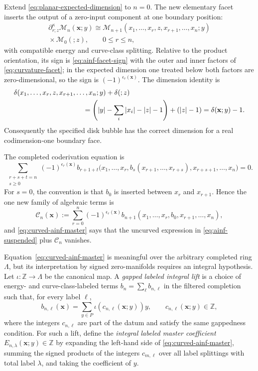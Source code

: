 \documentclass[11pt,letterpaper,twoside]{article}
\theoremstyle{plain}
\theoremstyle{definition}
\theoremstyle{remark}
\begin{document}
Extend \eqref{eq:planar-expected-dimension} to \(n=0\).  The new elementary facet inserts the output of a zero-input component at one boundary position:
\begin{multline}\label{eq:curvature-facet}
 \partial^{\kappa}_{r;z}\mathcal M_n(\mathbf x;y)
 \cong
 \mathcal M_{n+1}
 (x_1,\ldots,x_r,z,x_{r+1},\ldots,x_n;y)
 \\
 {}\times\mathcal M_0(;z),
 \qquad 0\leq r\leq n,
\end{multline}
with compatible energy and curve-class splitting.  Relative to the product orientation, its sign is \eqref{eq:ainf-facet-sign} with the outer and inner factors of \eqref{eq:curvature-facet}; in the expected dimension one treated below both factors are zero-dimensional, so the sign is \((-1)^{\epsilon_r(\mathbf x)}\).  The dimension identity is
\begin{align}\label{eq:curvature-dimension}
 &\delta(x_1,\ldots,x_r,z,x_{r+1},\ldots,x_n;y)
 +\delta(;z) \notag\\
 &\hspace{35mm}=
 \left(|y|-\sum_i|x_i|-|z|-1\right)+(|z|-1)
 =\delta(\mathbf x;y)-1.
\end{align}
Consequently the specified disk bubble has the correct dimension for a real codimension-one boundary face.

The completed coderivation equation is
\begin{equation}\label{eq:curved-ainf-master}
 \sum_{\substack{r+s+t=n\\s\geq0}}
 (-1)^{\epsilon_r(\mathbf x)}
 b_{r+1+t}\bigl(
 x_1,\ldots,x_r,
 b_s(x_{r+1},\ldots,x_{r+s}),
 x_{r+s+1},\ldots,x_n
 \bigr)=0.
\end{equation}
For \(s=0\), the convention is that \(b_0\) is inserted between \(x_r\) and \(x_{r+1}\).  Hence the one new family of algebraic terms is
\begin{equation}\label{eq:curvature-correction}
 \mathcal C_n(\mathbf x)
 :=\sum_{r=0}^{n}(-1)^{\epsilon_r(\mathbf x)}
 b_{n+1}(x_1,\ldots,x_r,b_0,x_{r+1},\ldots,x_n),
\end{equation}
and \eqref{eq:curved-ainf-master} says that the uncurved expression in \eqref{eq:ainf-suspended} plus \(\mathcal C_n\) vanishes.

Equation~\eqref{eq:curved-ainf-master} is meaningful over the arbitrary completed ring \(\Lambda\), but its interpretation by signed zero-manifolds requires an integral hypothesis.  Let \(\iota:\mathbb Z\to\Lambda\) be the canonical map.  A \emph{gapped labeled integral lift} is a choice of energy- and curve-class-labeled terms \(b_n=\sum_\ell b_{n,\ell}\) in the filtered completion such that, for every label \(\ell\),
\[
 b_{n,\ell}(\mathbf x)
 =\sum_{y\in P}\iota\!\left(c_{n,\ell}(\mathbf x;y)\right)y,
 \qquad c_{n,\ell}(\mathbf x;y)\in\mathbb Z,
\]
where the integers \(c_{n,\ell}\) are part of the datum and satisfy the same gappedness condition.  For such a lift, define the \emph{integral labeled master coefficient} \(E_{n,\lambda}(\mathbf x;y)\in\mathbb Z\) by expanding the left-hand side of \eqref{eq:curved-ainf-master}, summing the signed products of the integers \(c_{m,\ell}\) over all label splittings with total label \(\lambda\), and taking the coefficient of \(y\).
\end{document}
